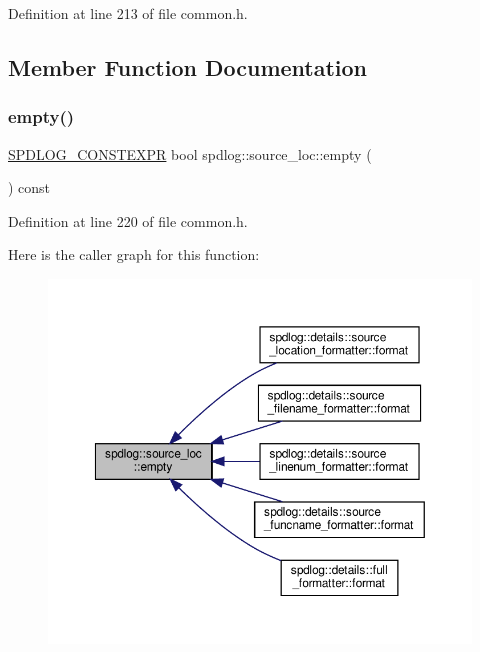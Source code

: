 Definition at line 213 of file common.\+h.



\subsection{Member Function Documentation}
\mbox{\label{structspdlog_1_1source__loc_a87cedeee3cb80521f33c3cf86651ae96}} 
\subsubsection{\texorpdfstring{empty()}{empty()}}
{\footnotesize\ttfamily \hyperlink{common_8h_a8747e6feba8bf2d3f204cb76bfd4607a}{S\+P\+D\+L\+O\+G\+\_\+\+C\+O\+N\+S\+T\+E\+X\+PR} bool spdlog\+::source\+\_\+loc\+::empty (\begin{DoxyParamCaption}{ }\end{DoxyParamCaption}) const\hspace{0.3cm}{\ttfamily [inline]}}



Definition at line 220 of file common.\+h.

Here is the caller graph for this function\+:
\nopagebreak
\begin{figure}[H]
\begin{center}
\leavevmode
\includegraphics[width=350pt]{structspdlog_1_1source__loc_a87cedeee3cb80521f33c3cf86651ae96_icgraph}
\end{center}
\end{figure}


